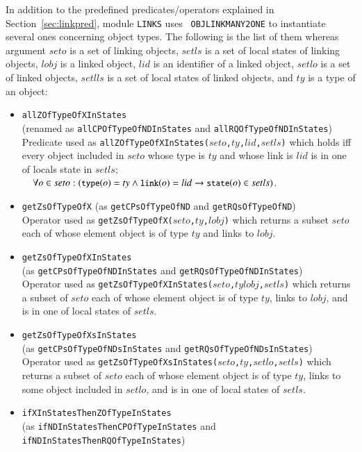 \documentclass[12pt]{report}
\newcommand{\ra}{\rightarrow}
\newcommand{\mbstt}[1]{\mbox{\small{\tt {#1}}}}
\newcommand{\stt}[1]{{\small{\tt {#1}}}}
\begin{document}
In addition to the predefined predicates/operators explained in
Section~\ref{sec:linkpred}, module {\tt LINKS} uses {\tt
  OBJLINKMANY2ONE} to instantiate several ones concerning object
types. The following is the list of them whereas argument $seto$ is a
set of linking objects, $setls$ is a set of local states of linking
objects, $lobj$ is a linked object, $lid$ is an identifier of a linked
object, $setlo$ is a set of linked objects, $setlls$ is a set of local
states of linked objects, and $ty$ is a type of an object:
\begin{itemize}
\item \stt{allZOfTypeOfXInStates}\\
  (renamed as \stt{allCPOfTypeOfNDInStates} and \stt{allRQOfTypeOfNDInStates})\\
  Predicate used as
  \stt{allZOfTypeOfXInStates($seto$,$ty$,$lid$,$setls$)} which holds
  iff every object included in $seto$ whose type is $ty$ and whose
  link is $lid$ is in one of locals state in $setls$;\\$~~~~\forall
  o\in
  seto:(\mbstt{type}(o)=ty\land\mbstt{link}(o)=lid\ra\mbstt{state}(o)\in
  setls)$.
\item \stt{getZsOfTypeOfX} (as \stt{getCPsOfTypeOfND} and \stt{getRQsOfTypeOfND})\\
  Operator used as \stt{getZsOfTypeOfX($seto$,$ty$,$lobj$)} which
  returns a subset $seto$ each of whose element object is of type $ty$
  and links to $lobj$.
\item \stt{getZsOfTypeOfXInStates}\\
  (as \stt{getCPsOfTypeOfNDInStates} and \stt{getRQsOfTypeOfNDInStates})\\
  Operator used as
  \stt{getZsOfTypeOfXInStates($seto$,$ty$$lobj$,$setls$)} which
  returns a subset of $seto$ each of whose element object is of type
  $ty$, links to $lobj$, and is in one of local states of $setls$.
\item \stt{getZsOfTypeOfXsInStates}\\
  (as \stt{getCPsOfTypeOfNDsInStates} and \stt{getRQsOfTypeOfNDsInStates})\\
  Operator used as
  \stt{getZsOfTypeOfXsInStates($seto$,$ty$,$setlo$,$setls$)} which
  returns a subset of $seto$ each of whose element object is of type
  $ty$, links to some object included in $setlo$, and is in one of
  local states of $setls$.
\item \stt{ifXInStatesThenZOfTypeInStates}\\
(as \stt{ifNDInStatesThenCPOfTypeInStates} and \stt{ifNDInStatesThenRQOfTypeInStates})\\

\end{itemize}
\end{document}
